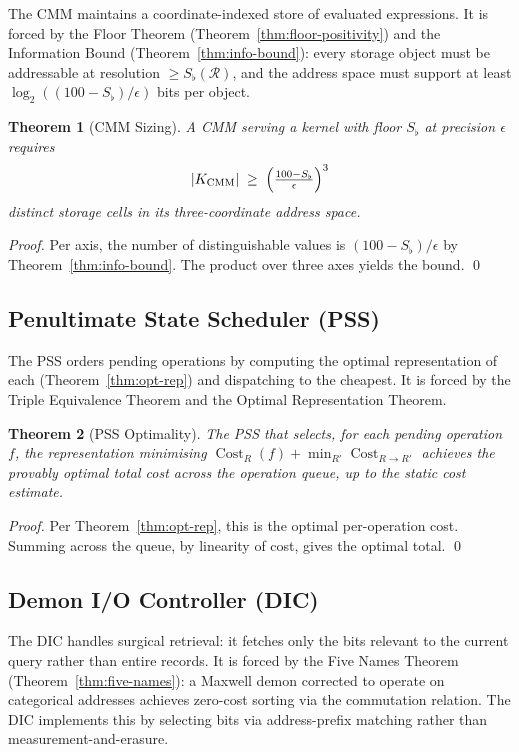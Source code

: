 \documentclass[twocolumn,a4paper]{article}
\newtheorem{theorem}{Theorem}[section]
\DeclareMathOperator{\Conv}{Cost}
\newcommand{\receiver}{\mathcal{R}}
\newcommand{\Sfloor}{S_{\flat}}
\begin{document}
The CMM maintains a coordinate-indexed store of evaluated expressions. It is forced by the Floor Theorem (Theorem~\ref{thm:floor-positivity}) and the Information Bound (Theorem~\ref{thm:info-bound}): every storage object must be addressable at resolution $\geq\Sfloor(\receiver)$, and the address space must support at least $\log_{2}((100-\Sfloor)/\epsilon)$ bits per object.

\begin{theorem}[CMM Sizing]
\label{thm:cmm-sizing}
A CMM serving a kernel with floor $\Sfloor$ at precision $\epsilon$ requires
\[
|K_{\mathrm{CMM}}|\;\geq\;\Bigl(\tfrac{100-\Sfloor}{\epsilon}\Bigr)^{3}
\]
distinct storage cells in its three-coordinate address space.
\end{theorem}

\begin{proof}
Per axis, the number of distinguishable values is $(100-\Sfloor)/\epsilon$ by Theorem~\ref{thm:info-bound}. The product over three axes yields the bound. \qed
\end{proof}

\subsection{Penultimate State Scheduler (PSS)}

The PSS orders pending operations by computing the optimal representation of each (Theorem~\ref{thm:opt-rep}) and dispatching to the cheapest. It is forced by the Triple Equivalence Theorem and the Optimal Representation Theorem.

\begin{theorem}[PSS Optimality]
\label{thm:pss-opt}
The PSS that selects, for each pending operation $f$, the representation minimising $\Conv_{R}(f)+\min_{R'}\Conv_{R\to R'}$ achieves the provably optimal total cost across the operation queue, up to the static cost estimate.
\end{theorem}

\begin{proof}
Per Theorem~\ref{thm:opt-rep}, this is the optimal per-operation cost. Summing across the queue, by linearity of cost, gives the optimal total. \qed
\end{proof}

\subsection{Demon I/O Controller (DIC)}

The DIC handles surgical retrieval: it fetches only the bits relevant to the current query rather than entire records. It is forced by the Five Names Theorem (Theorem~\ref{thm:five-names}): a Maxwell demon corrected to operate on categorical addresses achieves zero-cost sorting via the commutation relation. The DIC implements this by selecting bits via address-prefix matching rather than measurement-and-erasure.
\end{document}
